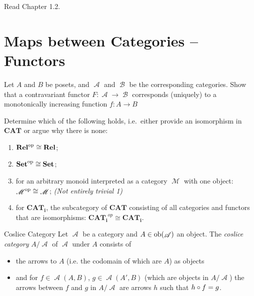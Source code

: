 \def\pathToRoot{../../}

\DeclareMathOperator{\A}{\mathscr A}
\DeclareMathOperator{\B}{\mathscr B}
\DeclareMathOperator{\M}{\mathscr M}




\author{Mostafa Ahmed Abdelfattah Abouhamra, Felix Rech, Dominik Wagner}

\begin{hint}
  Read Chapter 1.2.
\end{hint}

\section{Maps between Categories -- Functors}

\begin{exercise}
  Let $A$ and $B$ be posets, and $\A$ and $\B$ be the corresponding categories. Show that a contravariant functor $F:\A\rightarrow \B$ corresponds (uniquely) to a monotonically increasing function $f:A\rightarrow B$
\end{exercise}

\begin{exercise}
  Determine which of the following holds, i.e.\ either provide an isomorphism in $\mathbf{CAT}$ or argue why there is none:

  \begin{enumerate}
  \item $\mathbf {Rel}^{\mathrm{op}}\cong \mathbf {Rel}$;
  \item $\mathbf {Set}^{\mathrm{op}}\cong \mathbf {Set}$;
  \item for an arbitrary monoid interpreted as a category $\M$ with one object:  $\M^{\op}\cong \M$; \textit{(Not entirely trivial 1)}
  \item for $\mathbf{CAT_i}$, the subcategory of $\mathbf{CAT}$ consisting of all categories and functors that are isomorphisms: $\mathbf{CAT_i}^{op}\cong\mathbf{CAT_i}$.
  \end{enumerate}

\end{exercise}


\begin{definition}{Coslice Category}
  Let $\A$ be a category and $A\in\ob(\A)$ an object. The \emph{coslice category} $A/\A$ of $\A$ under $A$ consists of
  \begin{itemize}
  \item the arrows to $A$ (i.e. the codomain of which are $A$) as objects
  \item and for $f\in \A(A,B)$, $g\in\A(A',B)$ (which are objects in $A/\A$) the arrows between $f$ and $g$ in $A/\A$ are arrows $h$ such that $h\mathbin{\circ} f=g$.
  \end{itemize}
\end{definition}

